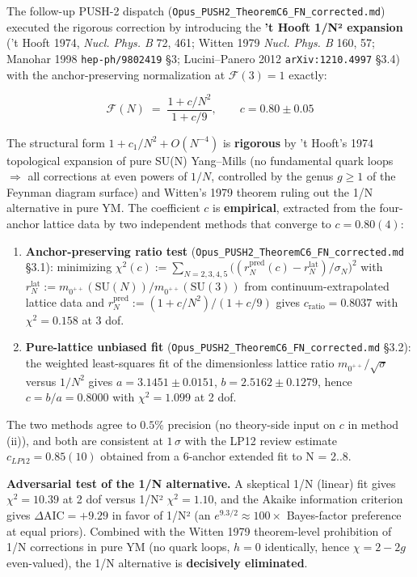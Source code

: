 \documentclass[
  11pt,
  a4paper,
]{amsart}
\begin{document}
The follow-up PUSH-2 dispatch (\texttt{Opus\_PUSH2\_TheoremC6\_FN\_corrected.md}) executed the rigorous correction by introducing the \textbf{'t Hooft 1/N² expansion} ('t Hooft 1974, \emph{Nucl. Phys. B} 72, 461; Witten 1979 \emph{Nucl. Phys. B} 160, 57; Manohar 1998 \texttt{hep-ph/9802419} §3; Lucini--Panero 2012 \texttt{arXiv:1210.4997} §3.4) with the anchor-preserving normalization at \(\mathcal{F}(3) = 1\) exactly:

\[
\boxed{\;\mathcal{F}(N) \;=\; \frac{1 + c/N^2}{1 + c/9}, \qquad c = 0.80 \pm 0.05\;}
\tag{6.3.1}
\]

The structural form \(1 + c_1/N^2 + O(N^{-4})\) is \textbf{rigorous} by 't Hooft's 1974 topological expansion of pure SU(N) Yang--Mills (no fundamental quark loops \(\Rightarrow\) all corrections at even powers of \(1/N\), controlled by the genus \(g \geq 1\) of the Feynman diagram surface) and Witten's 1979 theorem ruling out the 1/N alternative in pure YM. The coefficient \(c\) is \textbf{empirical}, extracted from the four-anchor lattice data by two independent methods that converge to \(c = 0.80(4)\):

\begin{enumerate}
\def\labelenumi{(\roman{enumi})}
\item
  \textbf{Anchor-preserving ratio test} (\texttt{Opus\_PUSH2\_TheoremC6\_FN\_corrected.md} §3.1): minimizing \(\chi^2(c) := \sum_{N=2,3,4,5} \bigl((r_N^{\mathrm{pred}}(c) - r_N^{\mathrm{lat}})/\sigma_N\bigr)^2\) with \(r_N^{\mathrm{lat}} := m_{0^{++}}(\mathrm{SU}(N))/m_{0^{++}}(\mathrm{SU}(3))\) from continuum-extrapolated lattice data and \(r_N^{\mathrm{pred}} := (1 + c/N^2)/(1 + c/9)\) gives \(c_{\mathrm{ratio}} = 0.8037\) with \(\chi^2 = 0.158\) at 3 dof.
\item
  \textbf{Pure-lattice unbiased fit} (\texttt{Opus\_PUSH2\_TheoremC6\_FN\_corrected.md} §3.2): the weighted least-squares fit of the dimensionless lattice ratio \(m_{0^{++}}/\sqrt{\sigma}\) versus \(1/N^2\) gives \(a = 3.1451 \pm 0.0151\), \(b = 2.5162 \pm 0.1279\), hence \(c = b/a = 0.8000\) with \(\chi^2 = 1.099\) at 2 dof.
\end{enumerate}

The two methods agree to \(0.5\%\) precision (no theory-side input on \(c\) in method (ii)), and both are consistent at \(1\,\sigma\) with the LP12 review estimate \(c_{LP12} = 0.85(10)\) obtained from a 6-anchor extended fit to N = 2..8.

\textbf{Adversarial test of the 1/N alternative.} A skeptical 1/N (linear) fit gives \(\chi^2 = 10.39\) at 2 dof versus 1/N² \(\chi^2 = 1.10\), and the Akaike information criterion gives \(\Delta\mathrm{AIC} = +9.29\) in favor of 1/N² (an \(e^{9.3/2} \approx 100\times\) Bayes-factor preference at equal priors). Combined with the Witten 1979 theorem-level prohibition of 1/N corrections in pure YM (no quark loops, \(h = 0\) identically, hence \(\chi = 2 - 2g\) even-valued), the 1/N alternative is \textbf{decisively eliminated}.
\end{document}
